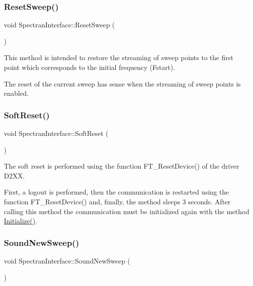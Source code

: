 \subsubsection{\texorpdfstring{Reset\+Sweep()}{ResetSweep()}}
{\footnotesize\ttfamily void Spectran\+Interface\+::\+Reset\+Sweep (\begin{DoxyParamCaption}{ }\end{DoxyParamCaption})}



This method is intended to restore the streaming of sweep points to the first point which corresponds to the initial frequency (Fstart). 

The reset of the current sweep has sense when the streaming of sweep points is enabled. \mbox{\label{classSpectranInterface_a59eff163ecf77f55bba22f49ef79d909}} 
\subsubsection{\texorpdfstring{Soft\+Reset()}{SoftReset()}}
{\footnotesize\ttfamily void Spectran\+Interface\+::\+Soft\+Reset (\begin{DoxyParamCaption}{ }\end{DoxyParamCaption})}



The soft reset is performed using the function {\ttfamily F\+T\+\_\+\+Reset\+Device()} of the driver D2\+XX. 

First, a logout is performed, then the communication is restarted using the function F\+T\+\_\+\+Reset\+Device() and, finally, the method sleeps 3 seconds. After calling this method the communication must be initialized again with the method \hyperlink{classSpectranInterface_a29d4a40c802f909b19014a5bfdac7db5}{Initialize()}. \mbox{\label{classSpectranInterface_a6064f5888f86d0913b8c2af429bdf278}} 
\subsubsection{\texorpdfstring{Sound\+New\+Sweep()}{SoundNewSweep()}}
{\footnotesize\ttfamily void Spectran\+Interface\+::\+Sound\+New\+Sweep (\begin{DoxyParamCaption}{ }\end{DoxyParamCaption})}



